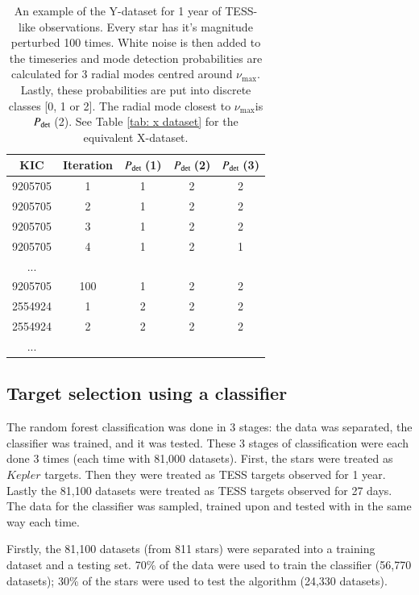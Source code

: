 \documentclass[a4paper,fleqn,usenatbib,useAMS]{mnras}
\newcommand{\numax}{\ensuremath{\nu_{\textrm{max}}}}
\newcommand{\pdet}{\ensuremath{P_{\rm det}\:}}
\begin{document}
\begin{table}
\begin{center}
\begin{tabular}{|*{5}{c|}}
KIC & Iteration & \pdet(1) & \pdet(2) & \pdet(3) \\
\hline
9205705	& 1     & 1 & 2 & 2 \\
9205705	& 2     & 1 & 2 & 2 \\
9205705	& 3     & 1 & 2 & 2 \\
9205705	& 4     & 1 & 2 & 1 \\
...                         \\
9205705	& 100   & 1 & 2 & 2 \\
2554924	& 1	    & 2 & 2 & 2 \\
2554924	& 2     & 2 & 2 & 2 \\
...                         \\
\hline
\end{tabular}
\end{center}
\caption{An example of the Y-dataset for 1 year of TESS-like observations. Every star has it's magnitude perturbed 100 times. White noise is then added to the timeseries and mode detection probabilities are calculated for 3 radial modes centred around \numax. Lastly, these probabilities are put into discrete classes [0, 1 or 2]. The radial mode closest to \numax is \pdet(2). See Table \ref{tab: x dataset} for the equivalent X-dataset.}
\label{tab: y dataset}
\end{table}



\subsection{Target selection using a classifier}
\label{sect: class-results}

The random forest classification was done in 3 stages: the data was separated, the classifier was trained, and it was tested. These 3 stages of classification were each done 3 times (each time with 81,000 datasets). First, the stars were treated as $Kepler$ targets. Then they were treated as TESS targets observed for 1 year. Lastly the 81,100 datasets were treated as TESS targets observed for 27 days. The data for the classifier was sampled, trained upon and tested with in the same way each time.

Firstly, the 81,100 datasets (from 811 stars) were separated into a training dataset and a testing set. 70\% of the data were used to train the classifier (56,770 datasets); 30\% of the stars were used to test the algorithm (24,330 datasets).
\end{document}
